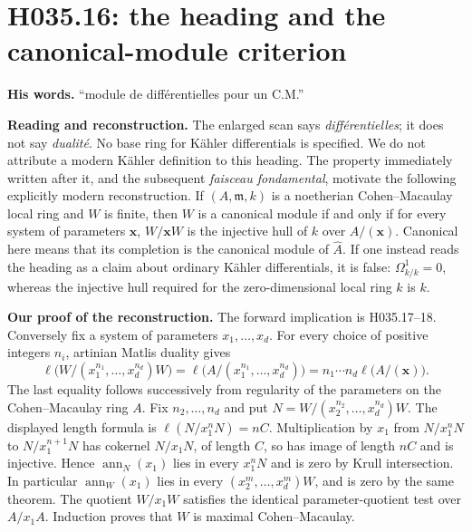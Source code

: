 \section{H035.16: the heading and the canonical-module criterion}
\textbf{His words.} ``module de différentielles pour un C.M.''

\textbf{Reading and reconstruction.} The enlarged scan says
\emph{différentielles}; it does not say \emph{dualité}. No base ring for
Kähler differentials is specified. We do not attribute a modern Kähler
definition to this heading. The property immediately written after it,
and the subsequent \emph{faisceau fondamental}, motivate the following
explicitly modern reconstruction. If $(A,\mathfrak m,k)$ is a noetherian
Cohen--Macaulay local ring and $W$ is finite, then $W$ is a canonical
module if and only if for every system of parameters $\mathbf x$,
$W/\mathbf xW$ is the injective hull of $k$ over $A/(\mathbf x)$.
Canonical here means that its completion is the canonical module of
$\widehat A$. If one instead reads the heading as a claim about ordinary
Kähler differentials, it is false: $\Omega^1_{k/k}=0$, whereas the
injective hull required for the zero-dimensional local ring $k$ is $k$.

\textbf{Our proof of the reconstruction.} The forward implication is
H035.17--18. Conversely fix a system of parameters $x_1,\ldots,x_d$.
For every choice of positive integers $n_i$, artinian Matlis duality gives
\[
 \ell\bigl(W/(x_1^{n_1},\ldots,x_d^{n_d})W\bigr)
 =\ell\bigl(A/(x_1^{n_1},\ldots,x_d^{n_d})\bigr)
 =n_1\cdots n_d\ell\bigl(A/(\mathbf x)\bigr).
\]
The last equality follows successively from regularity of the parameters
on the Cohen--Macaulay ring $A$. Fix $n_2,\ldots,n_d$ and put
$N=W/(x_2^{n_2},\ldots,x_d^{n_d})W$. The displayed length formula is
$\ell(N/x_1^nN)=nC$. Multiplication by $x_1$ from $N/x_1^nN$ to
$N/x_1^{n+1}N$ has cokernel $N/x_1N$, of length $C$, so has image
of length $nC$ and is injective. Hence $\operatorname{ann}_N(x_1)$
lies in every $x_1^nN$ and is zero by Krull intersection. In particular
$\operatorname{ann}_W(x_1)$ lies in every
$(x_2^m,\ldots,x_d^m)W$, and is zero by the same theorem. The quotient
$W/x_1W$ satisfies the identical parameter-quotient test over $A/x_1A$.
Induction proves that $W$ is maximal Cohen--Macaulay.

